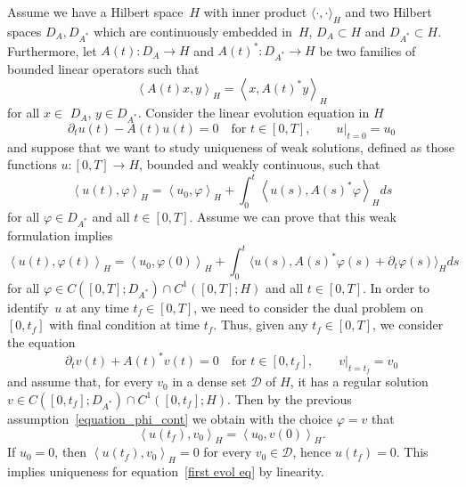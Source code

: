\documentclass[a4paper,10pt]{article}
\newcommand\1{\mathbbm{1}}
\numberwithin{equation}{section}
\begin{document}
Assume we have a Hilbert space~$H$ with inner product $\langle \cdot,\cdot \rangle _{H}$ and two Hilbert spaces $D_{A}, D_{A^{\ast}}$ which are continuously embedded in~$H$, $D_{A}\subset H$ and $D_{A^{\ast}}\subset H$. Furthermore, let $A(t) \colon D_{A}\rightarrow H$ and $A(t)^{\ast} \colon D_{A^{\ast}} \rightarrow H$ be two families of bounded linear operators such that
\begin{equation*}
\left\langle A(t)  x,y\right\rangle _{H}=\left\langle x,A(t)^{\ast}y\right\rangle _{H}
\end{equation*}
for all $x\in$ $D_{A}$, $y\in D_{A^{\ast}}$. Consider the linear evolution
equation in $H$ 
\begin{equation}
\partial_t u(t) -A(t)  u(t)   = 0 \quad \text{for }t\in [0,T], \label{first evol eq} \qquad
u|_{t=0}  =u_{0}
\end{equation}
and suppose that we want to study uniqueness of weak solutions, defined as those
functions $u \colon [0,T] \rightarrow H$, bounded and weakly
continuous, such that
\begin{equation*}
\left\langle u(t)  ,\varphi\right\rangle _{H}=\left\langle u_{0},\varphi\right\rangle _{H}+\int_{0}^{t}\left\langle u(s) ,A(s)^{\ast}\varphi\right\rangle_{H}ds
\end{equation*}
for all $\varphi\in D_{A^{\ast}}$ and all $t \in [0,T]$. Assume we can prove that this weak formulation implies
\begin{equation}
\label{equation_phi_cont}
\left\langle u(t),\varphi(t) \right\rangle _{H}=\left\langle u_{0},\varphi(0) \right\rangle_{H}+\int_{0}^{t} \Big\langle u(s),A(s)^{\ast}
\varphi(s)  + \partial_t \varphi(s) \Big\rangle_{H} ds
\end{equation}
for all $\varphi\in C([0,T];D_{A^{\ast}}) \cap C^{1}([0,T];H)$ and all $t \in [0,T]$. In order to identify~$u$ at any time $t_{f}\in [0,T]$, we need to consider the dual problem on
$[0,t_{f}]$ with final condition at time $t_{f}$. Thus, given any $t_{f}\in [0,T]$, we consider the equation
\begin{equation}
\partial_t v(t) +A(t)^{\ast}v(t)  =0 \quad \text{for } t \in [0,t_{f}], \label{dual evol eq} 
\qquad v|_{t=t_{f}} = v_{0}
\end{equation}
and assume that, for every $v_{0}$ in a dense set $\mathcal{D}$ of $H$, it has a regular solution $v\in C([0,t_{f}];D_{A^{\ast}}) \cap C^{1}([0,t_{f}];H)$. Then by the previous assumption~\eqref{equation_phi_cont} we obtain with the choice $\varphi =v$ that
\begin{equation*}
\left\langle u(t_{f}) ,v_{0}\right\rangle_{H}=\left\langle
u_{0},v(0) \right\rangle_{H}.
\end{equation*}
If $u_{0}=0$, then $\left\langle u(t_{f}) ,v_{0}\right\rangle_{H}=0$ for every $v_{0}\in\mathcal{D}$, hence $u(t_{f}) =0$. This implies uniqueness for equation~\eqref{first evol eq} by linearity.
\end{document}
